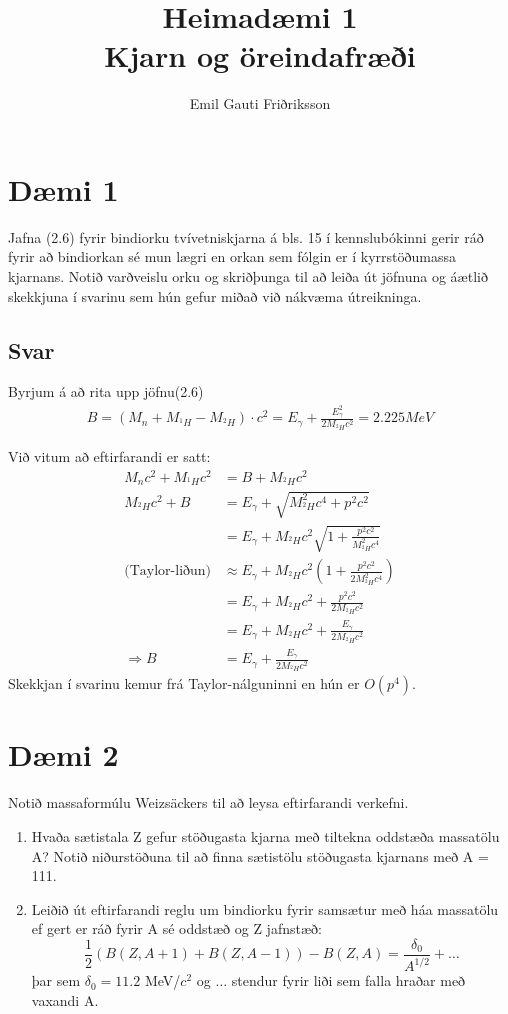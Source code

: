\documentclass[11pt]{article}
\title{\vspace{-3cm}Heimadæmi 1\\ \vspace{0.4cm} \large Kjarn og öreindafræði \vspace{-0.3cm}}
\author{Emil Gauti Friðriksson}
\begin{document}
\maketitle
\section*{Dæmi 1}
Jafna (2.6) fyrir bindiorku tvívetniskjarna á bls. 15 í kennslubókinni gerir ráð fyrir að bindiorkan sé mun lægri en orkan sem fólgin er í kyrrstöðumassa kjarnans. Notið varðveislu orku og skriðþunga til að leiða út jöfnuna og áætlið skekkjuna í svarinu sem hún gefur miðað við nákvæma útreikninga.

\subsection*{Svar}
Byrjum á að rita upp jöfnu(2.6)
\begin{align*}
    B = (M_n + M_{^1H}-M_{^2H})\cdot c^2 = E_\gamma + \frac{E_\gamma ^2}{2M_{^2H}c^2} = 2.225 MeV
\end{align*}

\noindent Við vitum að eftirfarandi er satt:
\begin{align*}
    M_n c^2 + M_{^1H} c^2   &= B + M_{^2H}c^2\\
    M_{^2H}c^2 + B          &= E_\gamma + \sqrt{M_{^2H}^2c^4 + p^2c^2}\\
                            &= E_\gamma + M_{^2H}c^2\sqrt{1 + \frac{p^2c^2}{M_{^2H}^2c^4}} \\
\text{(Taylor-liðun)}       &\approx E_\gamma + M_{^2H}c^2\left(1 + \frac{p^2c^2}{2M_{^2H}^2c^4}\right)\\
                            &=E_\gamma +  M_{^2H}c^2 + \frac{p^2c^2}{2M_{^2H}c^2}\\
                            &=E_\gamma +  M_{^2H}c^2 + \frac{E_\gamma}{2M_{^2H}c^2}\\
\Rightarrow             B   &=E_\gamma + \frac{E_\gamma}{2M_{^2H}c^2}
\end{align*}
Skekkjan í svarinu kemur frá Taylor-nálguninni en hún er $O(p^4)$.


\section*{Dæmi 2}
Notið massaformúlu Weizsäckers til að leysa eftirfarandi verkefni.
\begin{enumerate}[label=(\alph*)]
    \item Hvaða sætistala Z gefur stöðugasta kjarna með tiltekna oddstæða massatölu A? Notið niðurstöðuna til að finna sætistölu stöðugasta kjarnans með A = 111.
    \item Leiðið út eftirfarandi reglu um bindiorku fyrir samsætur með háa massatölu ef gert er ráð fyrir A sé oddstæð og Z jafnstæð: $$\frac { 1 } { 2 } ( B ( Z , A + 1 ) + B ( Z , A - 1 ) ) - B ( Z , A ) = \frac { \delta _ { 0 } } { A ^ { 1 / 2 } } + \ldots$$ þar sem $\delta_0 = 11.2$ MeV/$c^2$ og $\ldots$ stendur fyrir liði sem falla hraðar með vaxandi A.
\end{enumerate}
\end{document}
